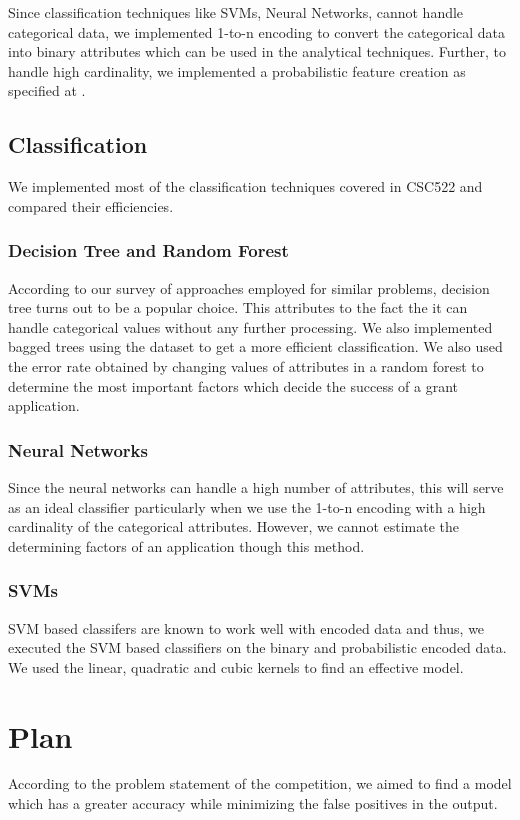 \documentclass{article} %
\begin{document}
Since classification techniques like SVMs, Neural Networks, cannot handle categorical data, we implemented 1-to-n encoding to convert the categorical data into binary attributes which can be used in the analytical techniques. Further, to handle high cardinality, we implemented a probabilistic feature creation as specified at \cite{HighCard}. 

\subsection{Classification}

We implemented most of the classification techniques covered in CSC522 and compared their efficiencies.

\subsubsection{Decision Tree and Random Forest}
According to our survey of approaches employed for similar problems, decision tree turns out to be a popular choice. This attributes to the fact the it can handle categorical values without any further processing. We also implemented bagged trees using the dataset to get a more efficient classification. We also used the error rate obtained by changing values of attributes in a random forest to determine the most important factors which decide the success of a grant application.

\subsubsection{Neural Networks}
Since the neural networks can handle a high number of attributes, this will serve as an ideal classifier particularly when we use the 1-to-n encoding with a high cardinality of the categorical attributes. However, we cannot estimate the determining factors of an application though this method.

\subsubsection{SVMs}
SVM based classifers are known to work well with encoded data and thus, we executed the SVM based classifiers on the binary and probabilistic encoded data. We used the linear, quadratic and cubic kernels to find an effective model. 

\section{Plan}
According to the problem statement of the competition, we aimed to find a model which has a greater accuracy while minimizing the false positives in the output.
\end{document}
